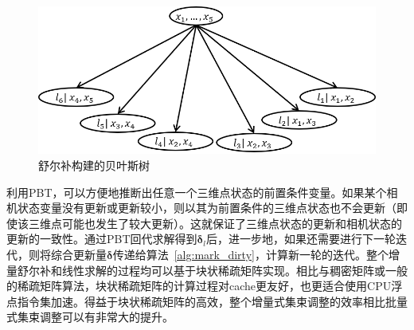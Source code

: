 \begin{figure}[htb!]
    \centering
    \includegraphics[scale=.7]{Pictures/bayes_forest.png}
    \caption{舒尔补构建的贝叶斯树}
    \label{fig:bayes_forest}
\end{figure}

利用PBT，可以方便地推断出任意一个三维点状态的前置条件变量。如果某个相机状态变量没有更新或更新较小，则以其为前置条件的三维点状态也不会更新（即使该三维点可能也发生了较大更新）。这就保证了三维点状态的更新和相机状态的更新的一致性。通过PBT回代求解得到$\bm{\delta}_l$后，进一步地，如果还需要进行下一轮迭代，则将综合更新量$\bm{\delta}$传递给算法~\ref{alg:mark_dirty}，计算新一轮的迭代。整个增量舒尔补和线性求解的过程均可以基于块状稀疏矩阵实现。相比与稠密矩阵或一般的稀疏矩阵算法，块状稀疏矩阵的计算过程对cache更友好，也更适合使用CPU浮点指令集加速。得益于块状稀疏矩阵的高效，整个增量式集束调整的效率相比批量式集束调整可以有非常大的提升。
